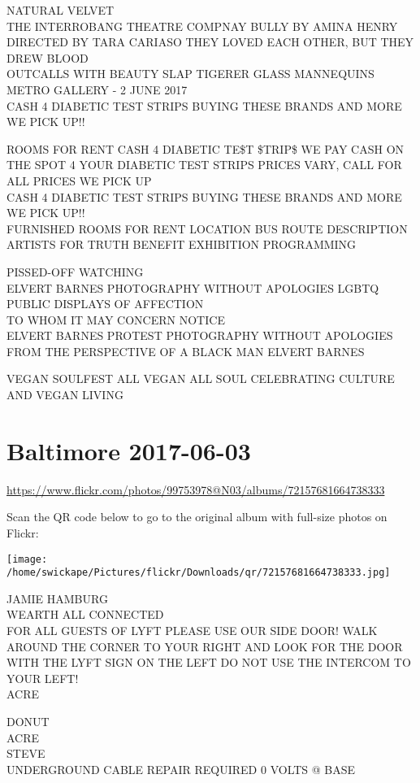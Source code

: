 \documentclass[10pt,letterpaper]{article}
\begin{document}
NATURAL VELVET\\
THE INTERROBANG THEATRE COMPNAY BULLY BY AMINA HENRY DIRECTED BY TARA CARIASO THEY LOVED EACH OTHER, BUT THEY DREW BLOOD\\
OUTCALLS WITH BEAUTY SLAP TIGERER GLASS MANNEQUINS METRO GALLERY {-} 2 JUNE 2017\\
CASH 4 DIABETIC TEST STRIPS BUYING THESE BRANDS AND MORE WE PICK UP!!

ROOMS FOR RENT CASH 4 DIABETIC TE\$T \$TRIP\$ WE PAY CASH ON THE SPOT 4 YOUR DIABETIC TEST STRIPS PRICES VARY, CALL FOR ALL PRICES WE PICK UP\\
CASH 4 DIABETIC TEST STRIPS BUYING THESE BRANDS AND MORE WE PICK UP!!\\
FURNISHED ROOMS FOR RENT LOCATION BUS ROUTE DESCRIPTION\\
ARTISTS FOR TRUTH BENEFIT EXHIBITION PROGRAMMING

PISSED{-}OFF WATCHING\\
ELVERT BARNES PHOTOGRAPHY WITHOUT APOLOGIES LGBTQ PUBLIC DISPLAYS OF AFFECTION\\
TO WHOM IT MAY CONCERN NOTICE\\
ELVERT BARNES PROTEST PHOTOGRAPHY WITHOUT APOLOGIES FROM THE PERSPECTIVE OF A BLACK MAN ELVERT BARNES

VEGAN SOULFEST ALL VEGAN ALL SOUL CELEBRATING CULTURE AND VEGAN LIVING


\section*{Baltimore 2017-06-03}

\url{https://www.flickr.com/photos/99753978@N03/albums/72157681664738333}

Scan the QR code below to go to the original album with full-size photos on Flickr:

\texttt{[image: /home/swickape/Pictures/flickr/Downloads/qr/72157681664738333.jpg]}


JAMIE HAMBURG\\
WEARTH ALL CONNECTED\\
FOR ALL GUESTS OF LYFT PLEASE USE OUR SIDE DOOR!  WALK AROUND THE CORNER TO YOUR RIGHT AND LOOK FOR THE DOOR WITH THE LYFT SIGN ON THE LEFT DO NOT USE THE INTERCOM TO YOUR LEFT!\\
ACRE

DONUT\\
ACRE\\
STEVE\\
UNDERGROUND CABLE REPAIR REQUIRED 0 VOLTS @ BASE
\end{document}
